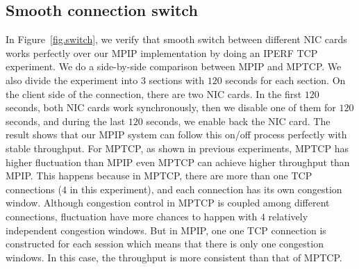 \subsection{Smooth connection switch}
\label{sec:switch}

In Figure~\ref{fig.switch}, we verify that smooth switch between different NIC cards works perfectly over our MPIP implementation by doing an IPERF TCP experiment. We do a side-by-side comparison between MPIP and MPTCP. We also divide the experiment into $3$ sections with $120$ seconds for each section. On the client side of the connection, there are two NIC cards. In the first $120$ seconds, both NIC cards work synchronously, then we disable one of them for $120$ seconds, and during the last $120$ seconds, we enable back the NIC card. The result shows that our MPIP system can follow this on/off process perfectly with stable throughput. For MPTCP, as shown in previous experiments, MPTCP has higher fluctuation than MPIP even MPTCP can achieve higher throughput than MPIP. This happens because in MPTCP, there are more than one TCP connections ($4$ in this experiment), and each connection has its own congestion window. Although congestion control in MPTCP is coupled among different connections, fluctuation have more chances to happen with $4$ relatively independent congestion windows. But in MPIP, one one TCP connection is constructed for each session which means that there is only one congestion windows. In this case, the throughput is more consistent than that of MPTCP.
